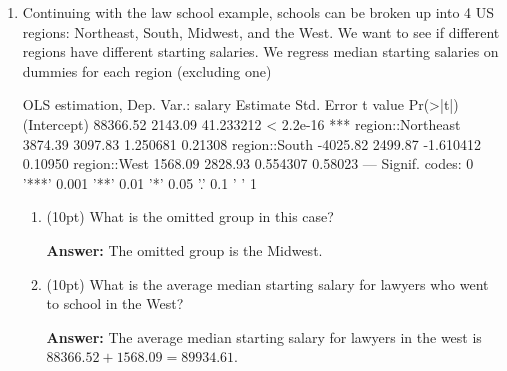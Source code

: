 \documentclass[12pt]{article}
\newcommand{\answer}[1]{{\color{blue_winged_teal}\textbf{Answer:} #1}}
\newcommand{\pts}[1]{{\color{zinc500}#1}}
\begin{document}
\begin{enumerate}
\begin{enumerate}
    \answer{A school with a rank of 10 schools lower, we predict their median starting salary to be $-\$2060$ lower. (1 school lower predicts a $-\$206$ lower). This estiamte is statistically significantly different from 0.}
    
    \item \pts{(10pt)} Form a 95\% confidence interval for the rank coefficient (the critical value of the middle 95\% is $\pm 1.96$).
    
    \answer{With 95\% confidence, we think the true association of rank and median starting salary is within this range $-206.731 \pm 12.5843 = (182.06, 231.39)$.}
  \end{enumerate}
  



  \vspace{5mm}
  \item Continuing with the law school example, schools can be broken up into 4 US regions: Northeast, South, Midwest, and the West. We want to see if different regions have different starting salaries. We regress median starting salaries on dummies for each region (excluding one)
  \begin{codeblock}[{}]
OLS estimation, Dep. Var.: salary
                    Estimate Std. Error   t value  Pr(>|t|)    
(Intercept)        88366.52    2143.09 41.233212 < 2.2e-16 ***
region::Northeast   3874.39    3097.83  1.250681   0.21308    
region::South      -4025.82    2499.87 -1.610412   0.10950    
region::West        1568.09    2828.93  0.554307   0.58023    
---
Signif. codes:  0 '***' 0.001 '**' 0.01 '*' 0.05 '.' 0.1 ' ' 1
  \end{codeblock}

  \begin{enumerate}
    \item \pts{(10pt)} What is the omitted group in this case?

    \answer{The omitted group is the Midwest.}

    \item \pts{(10pt)} What is the average median starting salary for lawyers who went to school in the West? 
    
    \answer{The average median starting salary for lawyers in the west is $88366.52 + 1568.09 = 89934.61$.}
  \end{enumerate}

\end{enumerate}
\end{document}
